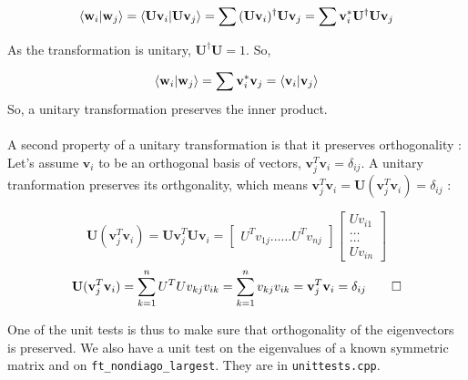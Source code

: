 \documentclass[a4paper, twoside, 11pt]{report}
\theoremstyle{theorem}
\theoremstyle{remark}
\theoremstyle{exemple}
\begin{document}
       			\begin{equation*}\braket{\mathbf{w}_i}{\mathbf{w}_j} = \braket{\mathbf{Uv}_i}{\mathbf{Uv}_j} = \sum{(\mathbf{Uv}_i)^\dag \mathbf{Uv}_j} = \sum{\mathbf{v}_i^* \mathbf{U}^\dag \mathbf{Uv}_j}\end{equation*}
             
			As the transformation is unitary, $\mathbf{U}^\dag \mathbf{U} = 1$. So,

      		        \begin{equation*}\braket{\mathbf{w}_i}{\mathbf{w}_j} = \sum{\mathbf{v}_i^* \mathbf{v}_j} = \braket{\mathbf{v}_i}{\mathbf{v}_j}
      		        \end{equation*}
        	        So, a unitary transformation preserves the inner product. \\
        	        \\
        	        A second property of a unitary transformation is that it preserves orthogonality : \\
        	        Let's assume $\mathbf{v}_i$ to be an orthogonal basis of vectors, $\mathbf{v}_j^T \mathbf{v}_i = \delta_{ij}$. A unitary tranformation preserves its orthgonality, which means $\mathbf{v}_j^T\mathbf{v}_i = \mathbf{U} (\mathbf{v}_j^T\mathbf{v}_i) = \delta_{ij}$ :

       		            \begin{equation*}
				\mathbf{U} (\mathbf{v}_j^T\mathbf{v}_i) = \mathbf{Uv}_j^T\mathbf{Uv}_i = 				\begin{bmatrix}
					{U^T v_{1j}} \dots \dots {U^T v_{nj}}
				\end{bmatrix}
				\begin{bmatrix}
					Uv_{i1} \\ \dots \\ \dots \\Uv_{in}
				\end{bmatrix}
			    \end{equation*}
        	        \begin{equation*}\mathbf{U} (\mathbf{v}_j^T\mathbf{v}_i) = \sum_{k=1}^{n}{U^T U v_{kj} v_{ik}} = \sum_{k=1}^{n}{v_{kj} v_{ik}} = \mathbf{v}_j^T\mathbf{v}_i = \delta_{ij} \qed
        	        \end{equation*}			
			
			One of the unit tests is thus to make sure that orthogonality of the eigenvectors is preserved. We also have a unit test on the eigenvalues of a known symmetric matrix and on \texttt{ft\_nondiago\_largest}. They are in \texttt{unittests.cpp}.
				
\end{document}

